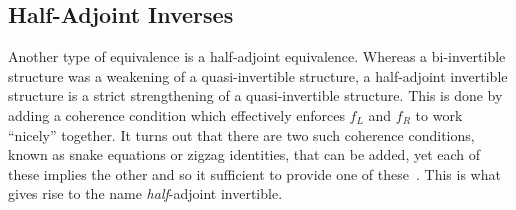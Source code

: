 \documentclass{article}
\begin{document}
\subsection{Half-Adjoint Inverses}\label{sec:hai}

Another type of equivalence is a half-adjoint equivalence. Whereas a
bi-invertible structure was a weakening of a quasi-invertible
structure, a half-adjoint invertible structure is a strict
strengthening of a quasi-invertible structure. This is done by adding
a coherence condition which effectively enforces \(f_L\) and \(f_R\)
to work ``nicely'' together. It turns out that there are two such
coherence conditions, known as snake equations or zigzag identities,
that can be added, yet each of these implies the other and so it
sufficient to provide one of these~\cite[Lemma
3.2]{nlab:adjoint_equivalence}. This is what gives rise to the name
\emph{half}-adjoint invertible.
\end{document}
